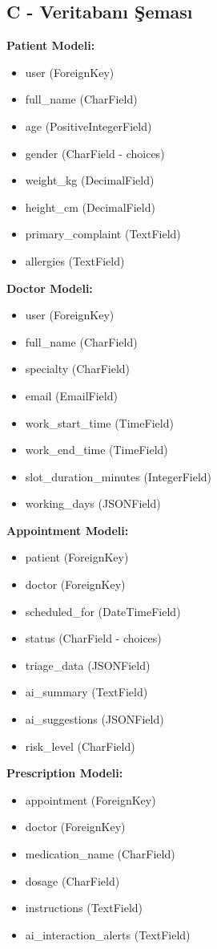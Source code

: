 \documentclass[12pt,a4paper]{article}
\begin{document}
\subsection{C - Veritabanı Şeması}

\textbf{Patient Modeli:}
\begin{itemize}
    \item user (ForeignKey)
    \item full\_name (CharField)
    \item age (PositiveIntegerField)
    \item gender (CharField - choices)
    \item weight\_kg (DecimalField)
    \item height\_cm (DecimalField)
    \item primary\_complaint (TextField)
    \item allergies (TextField)
\end{itemize}

\textbf{Doctor Modeli:}
\begin{itemize}
    \item user (ForeignKey)
    \item full\_name (CharField)
    \item specialty (CharField)
    \item email (EmailField)
    \item work\_start\_time (TimeField)
    \item work\_end\_time (TimeField)
    \item slot\_duration\_minutes (IntegerField)
    \item working\_days (JSONField)
\end{itemize}

\textbf{Appointment Modeli:}
\begin{itemize}
    \item patient (ForeignKey)
    \item doctor (ForeignKey)
    \item scheduled\_for (DateTimeField)
    \item status (CharField - choices)
    \item triage\_data (JSONField)
    \item ai\_summary (TextField)
    \item ai\_suggestions (JSONField)
    \item risk\_level (CharField)
\end{itemize}

\textbf{Prescription Modeli:}
\begin{itemize}
    \item appointment (ForeignKey)
    \item doctor (ForeignKey)
    \item medication\_name (CharField)
    \item dosage (CharField)
    \item instructions (TextField)
    \item ai\_interaction\_alerts (TextField)
\end{itemize}
\end{document}
